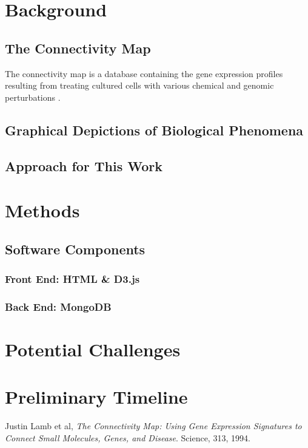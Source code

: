 \documentclass[12pt]{article}
\begin{document}
\section{Background}
\subsection{The Connectivity Map}
\begin{multicols}{2}
The connectivity map is a database containing the gene expression profiles resulting from treating cultured cells with various chemical and genomic perturbations \citep{lamb2006}.
\end{multicols}
\subsection{Graphical Depictions of Biological Phenomena}
\subsection{Approach for This Work}

\section{Methods}
\subsection{Software Components}
\subsubsection{Front End: HTML \& D3.js}
\subsubsection{Back End: MongoDB}
\begin{multicols}{2}

\end{multicols}

\section{Potential Challenges}
\begin{multicols}{2}

\end{multicols}


\section{Preliminary Timeline}

\begin{thebibliography}{99}
  Justin Lamb et al,
  \emph{The Connectivity Map: Using Gene Expression
   Signatures to Connect Small Molecules, Genes, and Disease}.
  Science,
   313,
  1994.
\end{thebibliography}
\end{document}
